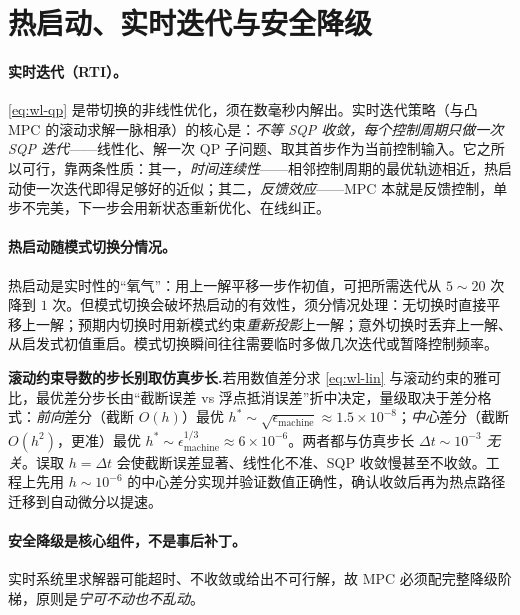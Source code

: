 \section{热启动、实时迭代与安全降级}
\label{sec:wl-rti}

\paragraph{实时迭代（RTI）。}
\cref{eq:wl-qp} 是带切换的非线性优化，须在数毫秒内解出。实时迭代策略（与凸 MPC 的滚动求解一脉相承）的核心是：\emph{不等 SQP 收敛，每个控制周期只做一次 SQP 迭代}——线性化、解一次 QP 子问题、取其首步作为当前控制输入。它之所以可行，靠两条性质：其一，\emph{时间连续性}——相邻控制周期的最优轨迹相近，热启动使一次迭代即得足够好的近似；其二，\emph{反馈效应}——MPC 本就是反馈控制，单步不完美，下一步会用新状态重新优化、在线纠正。

\paragraph{热启动随模式切换分情况。}
热启动是实时性的“氧气”：用上一解平移一步作初值，可把所需迭代从 $5\!\sim\!20$ 次降到 $1$ 次。但模式切换会破坏热启动的有效性，须分情况处理：无切换时直接平移上一解；预期内切换时用新模式约束\emph{重新投影}上一解；意外切换时丢弃上一解、从启发式初值重启。模式切换瞬间往往需要临时多做几次迭代或暂降控制频率。

\begin{note}
\textbf{滚动约束导数的步长别取仿真步长.}\;若用数值差分求 \cref{eq:wl-lin} 与滚动约束的雅可比，最优差分步长由“截断误差 vs 浮点抵消误差”折中决定，量级取决于差分格式：\emph{前向}差分（截断 $O(h)$）最优 $h^\ast\!\sim\!\sqrt{\epsilon_{\mathrm{machine}}}\!\approx\!1.5\times10^{-8}$；\emph{中心}差分（截断 $O(h^2)$，更准）最优 $h^\ast\!\sim\!\epsilon_{\mathrm{machine}}^{1/3}\!\approx\!6\times10^{-6}$。两者都与仿真步长 $\Delta t\sim10^{-3}$ \emph{无关}。误取 $h=\Delta t$ 会使截断误差显著、线性化不准、SQP 收敛慢甚至不收敛。工程上先用 $h\sim10^{-6}$ 的中心差分实现并验证数值正确性，确认收敛后再为热点路径迁移到自动微分以提速。
\end{note}

\paragraph{安全降级是核心组件，不是事后补丁。}
实时系统里求解器可能超时、不收敛或给出不可行解，故 MPC 必须配完整降级阶梯，原则是\emph{宁可不动也不乱动}。

